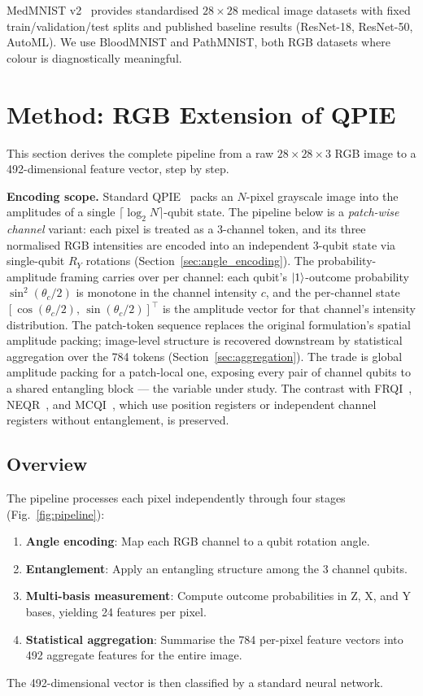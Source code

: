 \documentclass[conference,compsoc]{IEEEtran}
\begin{document}
MedMNIST v2~\cite{yang2023medmnist} provides standardised $28 \times 28$ medical image datasets with fixed train/validation/test splits and published baseline results (ResNet-18, ResNet-50, AutoML).
We use BloodMNIST and PathMNIST, both RGB datasets where colour is diagnostically meaningful.

\section{Method: RGB Extension of QPIE}
\label{sec:method}

This section derives the complete pipeline from a raw $28 \times 28 \times 3$ RGB image to a 492-dimensional feature vector, step by step.

\textbf{Encoding scope.} Standard QPIE~\cite{yao2017quantum} packs an $N$-pixel grayscale image into the amplitudes of a single $\lceil\log_2 N\rceil$-qubit state. The pipeline below is a \emph{patch-wise channel} variant: each pixel is treated as a 3-channel token, and its three normalised RGB intensities are encoded into an independent 3-qubit state via single-qubit $R_Y$ rotations (Section~\ref{sec:angle_encoding}). The probability-amplitude framing carries over per channel: each qubit's $\ket{1}$-outcome probability $\sin^2(\theta_c/2)$ is monotone in the channel intensity $c$, and the per-channel state $[\cos(\theta_c/2),\,\sin(\theta_c/2)]^\top$ is the amplitude vector for that channel's intensity distribution. The patch-token sequence replaces the original formulation's spatial amplitude packing; image-level structure is recovered downstream by statistical aggregation over the 784 tokens (Section~\ref{sec:aggregation}). The trade is global amplitude packing for a patch-local one, exposing every pair of channel qubits to a shared entangling block --- the variable under study. The contrast with FRQI~\cite{le2011flexible}, NEQR~\cite{zhang2013neqr}, and MCQI~\cite{sun2011multi}, which use position registers or independent channel registers without entanglement, is preserved.

\subsection{Overview}

The pipeline processes each pixel independently through four stages (Fig.~\ref{fig:pipeline}):
\begin{enumerate}
    \item \textbf{Angle encoding}: Map each RGB channel to a qubit rotation angle.
    \item \textbf{Entanglement}: Apply an entangling structure among the 3 channel qubits.
    \item \textbf{Multi-basis measurement}: Compute outcome probabilities in Z, X, and Y bases, yielding 24 features per pixel.
    \item \textbf{Statistical aggregation}: Summarise the 784 per-pixel feature vectors into 492 aggregate features for the entire image.
\end{enumerate}
The 492-dimensional vector is then classified by a standard neural network.
\end{document}
